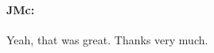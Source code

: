 \documentclass[output=paper]{langscibook}
\begin{document}
\paragraph*{JMc:} Yeah, that was great. Thanks very much.

\nocite{travail}
\nocite{bulletins}
\nocite{bulletinsb}
\nocite{rapport}
\nocite{diderichsen1960a}
\nocite{hjelmslev1931a}
\nocite{holt1946a}
\nocite{jespersen1913a}
\nocite{jespersen1918a}
\nocite{jespersen1924a}
\nocite{saussure1922a}
\nocite{ducrot1968a}
\nocite{cigana2022a}
\nocite{thomas2019a}
\nocite{rasmussen1987a}


\sloppy
\PrintPrimarySources{}
\PrintSecondarySources{}
\end{document}
